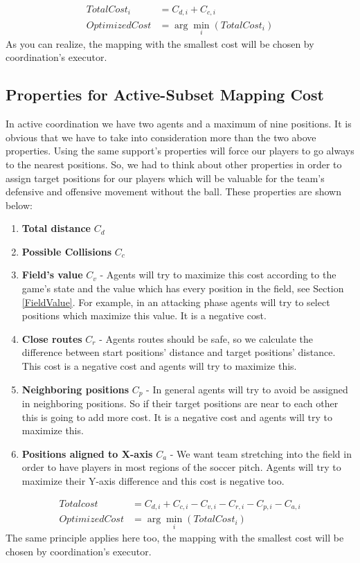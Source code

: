 \begin{align*}
TotalCost_{i} &= C_{d,i}+C_{c,i}\\
Optimized Cost &= \arg\min_{i}(TotalCost_{i})
\end{align*}
As you can realize, the mapping with the smallest cost will be chosen by coordination's executor.


\subsection{Properties for Active-Subset Mapping Cost}
In active coordination we have two agents and a maximum of nine positions. It is obvious that we have to take into consideration more than the two above properties. Using the same support's properties will force our players to go always to the nearest positions. So, we had to think about other properties in order to assign target positions for our players which will be valuable for the team's defensive and offensive movement without the ball. These properties are shown below:
\begin{enumerate}
\item \textbf{Total distance }$C_{d}$
\item \textbf{Possible Collisions }$C_{c}$
\item \textbf{Field's value }$C_{v}$ - Agents will try to maximize this cost according to the game's state and the value which has every position in the field, see Section \ref{FieldValue}. For example, in an attacking phase agents will try to select positions which maximize this value. It is a negative cost.
\item \textbf{Close routes }$C_{r}$ - Agents routes should be safe, so we calculate the difference between start positions' distance and target positions' distance. This cost is a negative cost and agents will try to maximize this.
\item \textbf{Neighboring positions }$C_{p}$ - In general agents will try to avoid be assigned in neighboring positions. So if their target positions are near to each other this is going to add more cost. It is a negative cost and agents will try to maximize this.
\item \textbf{Positions aligned to X-axis }$C_{a}$ - We want team stretching into the field in order to have players in most regions of the soccer pitch. Agents will try to maximize their Y-axis difference and this cost is negative too. 
\end{enumerate}
\begin{align*}
Total cost &= C_{d,i}+C_{c,i}-C_{v,i}-C_{r,i}-C_{p,i}-C_{a,i}\\
Optimized Cost &= \arg\min_{i}(TotalCost_{i})
\end{align*}
The same principle applies here too, the mapping with the smallest cost will be chosen by coordination's executor.



